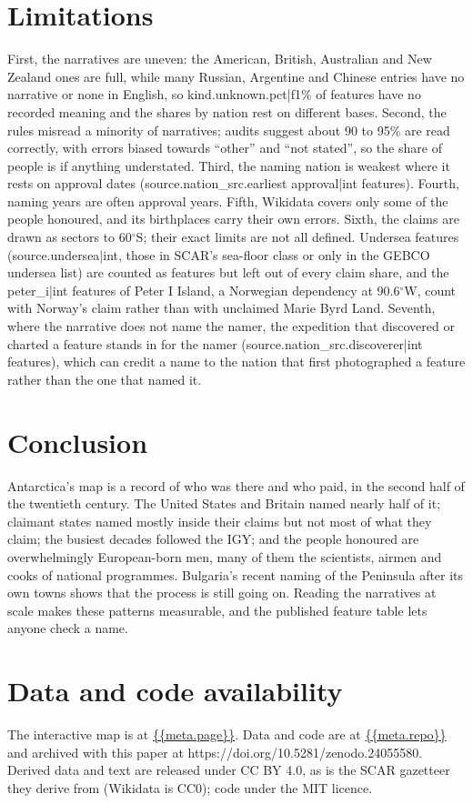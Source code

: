 \documentclass[11pt,a4paper]{article}
\begin{document}
\section{Limitations}
First, the narratives are uneven: the American, British, Australian and New Zealand ones are full, while many Russian, Argentine and Chinese entries have no narrative or none in English, so {{kind.unknown.pct|f1}}\% of features have no recorded meaning and the shares by nation rest on different bases. Second, the rules misread a minority of narratives; audits suggest about 90 to 95\% are read correctly, with errors biased towards ``other'' and ``not stated'', so the share of people is if anything understated. Third, the naming nation is weakest where it rests on approval dates ({{source.nation_src.earliest approval|int}} features). Fourth, naming years are often approval years. Fifth, Wikidata covers only some of the people honoured, and its birthplaces carry their own errors. Sixth, the claims are drawn as sectors to 60$^\circ$S; their exact limits are not all defined. Undersea features ({{source.undersea|int}}, those in SCAR's sea-floor class or only in the GEBCO undersea list) are counted as features but left out of every claim share, and the {{peter_i|int}} features of Peter I Island, a Norwegian dependency at 90.6$^\circ$W, count with Norway's claim rather than with unclaimed Marie Byrd Land. Seventh, where the narrative does not name the namer, the expedition that discovered or charted a feature stands in for the namer ({{source.nation_src.discoverer|int}} features), which can credit a name to the nation that first photographed a feature rather than the one that named it.

\section{Conclusion}
Antarctica's map is a record of who was there and who paid, in the second half of the twentieth century. The United States and Britain named nearly half of it; claimant states named mostly inside their claims but not most of what they claim; the busiest decades followed the IGY; and the people honoured are overwhelmingly European-born men, many of them the scientists, airmen and cooks of national programmes. Bulgaria's recent naming of the Peninsula after its own towns shows that the process is still going on. Reading the narratives at scale makes these patterns measurable, and the published feature table lets anyone check a name.

\section*{Data and code availability}
The interactive map is at \url{{{meta.page}}}. Data and code are at \url{{{meta.repo}}} and archived with this paper at https://doi.org/10.5281/zenodo.24055580. Derived data and text are released under CC BY 4.0, as is the SCAR gazetteer they derive from (Wikidata is CC0); code under the MIT licence.
\end{document}
